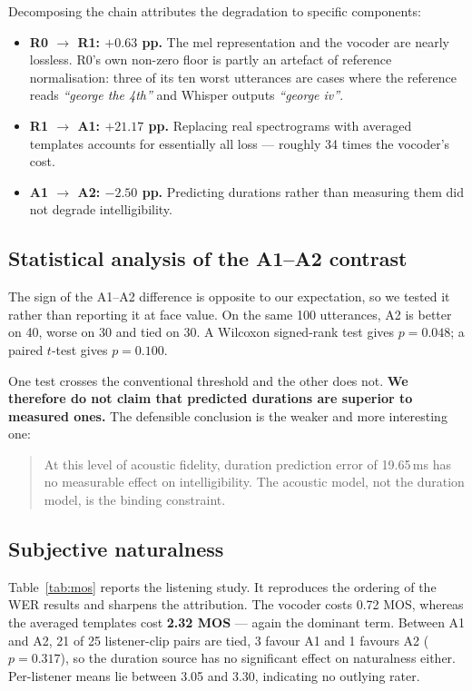 \documentclass[conference]{IEEEtran}
\begin{document}
Decomposing the chain attributes the degradation to specific components:

\begin{itemize}
\item \textbf{R0 $\rightarrow$ R1: $+0.63$ pp.} The mel representation and the vocoder are
      nearly lossless. R0's own non-zero floor is partly an artefact of reference normalisation:
      three of its ten worst utterances are cases where the reference reads \emph{``george the
      4th''} and Whisper outputs \emph{``george iv''}.
\item \textbf{R1 $\rightarrow$ A1: $+21.17$ pp.} Replacing real spectrograms with averaged
      templates accounts for essentially all loss --- roughly 34 times the vocoder's cost.
\item \textbf{A1 $\rightarrow$ A2: $-2.50$ pp.} Predicting durations rather than measuring them
      did not degrade intelligibility.
\end{itemize}

\subsection{Statistical analysis of the A1--A2 contrast}
\label{sec:stats}
The sign of the A1--A2 difference is opposite to our expectation, so we tested it rather than
reporting it at face value. On the same 100 utterances, A2 is better on 40, worse on 30 and tied
on 30. A Wilcoxon signed-rank test gives $p=0.048$; a paired $t$-test gives $p=0.100$.

One test crosses the conventional threshold and the other does not. \textbf{We therefore do not
claim that predicted durations are superior to measured ones.} The defensible conclusion is the
weaker and more interesting one:

\begin{quote}
At this level of acoustic fidelity, duration prediction error of 19.65\,ms has no measurable
effect on intelligibility. The acoustic model, not the duration model, is the binding constraint.
\end{quote}

\subsection{Subjective naturalness}
\label{sec:mos}
Table~\ref{tab:mos} reports the listening study. It reproduces the ordering of the WER results
and sharpens the attribution. The vocoder costs 0.72 MOS, whereas the averaged templates cost
\textbf{2.32 MOS} --- again the dominant term. Between A1 and A2, 21 of 25 listener-clip pairs
are tied, 3 favour A1 and 1 favours A2 ($p=0.317$), so the duration source has no significant
effect on naturalness either. Per-listener means lie between 3.05 and 3.30, indicating no
outlying rater.
\end{document}
